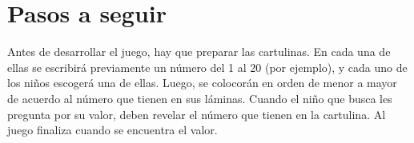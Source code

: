 \documentclass{article}
\begin{document}
\section{Pasos a seguir}
Antes de desarrollar el juego, hay que preparar las cartulinas. En cada una de ellas se escribirá previamente un número del 1 al 20 (por ejemplo), y cada uno de los niños escogerá una de ellas. 
Luego, se colocorán en orden de menor a mayor de acuerdo al número que tienen en sus láminas. 
Cuando el niño que busca les pregunta por su valor, deben revelar el número que tienen en la cartulina. 
Al juego finaliza cuando se encuentra el valor. 
\end{document}
